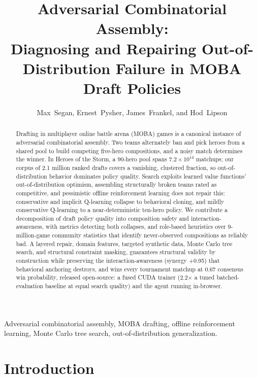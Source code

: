 \documentclass[journal]{IEEEtran}
\newif\ifanonymous
\begin{document}
\title{Adversarial Combinatorial Assembly:\\ Diagnosing and Repairing Out-of-Distribution Failure in MOBA Draft Policies}
\ifanonymous
\author{Anonymous Authors}
\else
\author{Max~Segan, Ernest~Pysher, James~Frankel, and Hod~Lipson}
\fi
\maketitle

\begin{abstract}
Drafting in multiplayer online battle arena (MOBA) games is a canonical instance of adversarial combinatorial assembly. Two teams alternately ban and pick heroes from a shared pool to build competing five-hero compositions, and a noisy match determines the winner. In Heroes of the Storm, a 90-hero pool spans $7.2 \times 10^{14}$ matchups; our corpus of 2.1 million ranked drafts covers a vanishing, clustered fraction, so out-of-distribution behavior dominates policy quality. Search exploits learned value functions' out-of-distribution optimism, assembling structurally broken teams rated as competitive, and pessimistic offline reinforcement learning does not repair this: conservative and implicit Q-learning collapse to behavioral cloning, and mildly conservative Q-learning to a near-deterministic ten-hero policy. We contribute a decomposition of draft policy quality into composition safety and interaction-awareness, with metrics detecting both collapses, and role-based heuristics over 9-million-game community statistics that identify never-observed compositions as reliably bad. A layered repair, domain features, targeted synthetic data, Monte Carlo tree search, and structural constraint masking, guarantees structural validity by construction while preserving the interaction-awareness (synergy +0.95) that behavioral anchoring destroys, and wins every tournament matchup at 0.67 consensus win probability, released open-source: a fused CUDA trainer (2.2$\times$ a tuned batched-evaluation baseline at equal search quality) and the agent running in-browser.
\end{abstract}

\begin{IEEEkeywords}
Adversarial combinatorial assembly, MOBA drafting, offline reinforcement learning, Monte Carlo tree search, out-of-distribution generalization.
\end{IEEEkeywords}

\section{Introduction}
\end{document}
